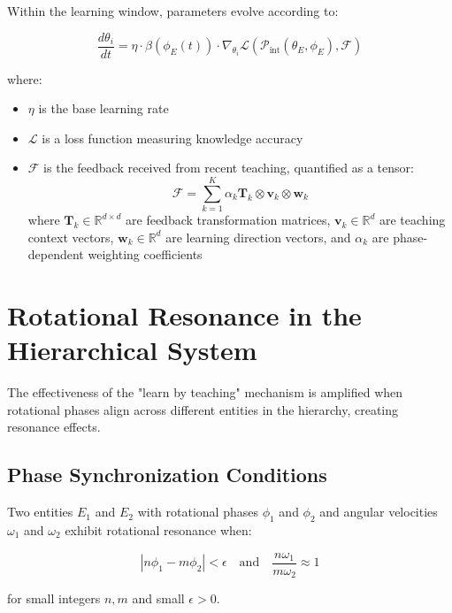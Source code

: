 \begin{theorem}
Within the learning window, parameters evolve according to:

\begin{equation}
\frac{d\theta_i}{dt} = \eta \cdot \beta(\phi_E(t)) \cdot \nabla_{\theta_i} \mathcal{L}(\mathcal{P}_{\text{int}}(\theta_E, \phi_E), \mathcal{F})
\end{equation}

where:
\begin{itemize}
    \item $\eta$ is the base learning rate
    \item $\mathcal{L}$ is a loss function measuring knowledge accuracy
    \item $\mathcal{F}$ is the feedback received from recent teaching, quantified as a tensor:
    \begin{equation}
    \mathcal{F} = \sum_{k=1}^K \alpha_k \mathbf{T}_k \otimes \mathbf{v}_k \otimes \mathbf{w}_k
    \end{equation}
    where $\mathbf{T}_k \in \mathbb{R}^{d \times d}$ are feedback transformation matrices, $\mathbf{v}_k \in \mathbb{R}^d$ are teaching context vectors, $\mathbf{w}_k \in \mathbb{R}^d$ are learning direction vectors, and $\alpha_k$ are phase-dependent weighting coefficients
\end{itemize}
\end{theorem}

\section{Rotational Resonance in the Hierarchical System}

The effectiveness of the "learn by teaching" mechanism is amplified when rotational phases align across different entities in the hierarchy, creating resonance effects.

\subsection{Phase Synchronization Conditions}

\begin{definition}
Two entities $E_1$ and $E_2$ with rotational phases $\phi_1$ and $\phi_2$ and angular velocities $\omega_1$ and $\omega_2$ exhibit rotational resonance when:

\begin{equation}
|n\phi_1 - m\phi_2| < \epsilon \quad \text{and} \quad \frac{n\omega_1}{m\omega_2} \approx 1
\end{equation}

for small integers $n, m$ and small $\epsilon > 0$.
\end{definition}

